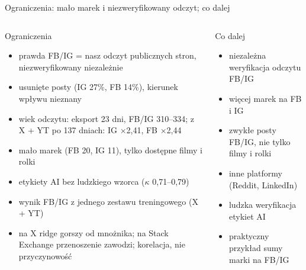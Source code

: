 \documentclass[aspectratio=169,10pt]{beamer}
\renewcommand{\x}[1]{$\times$#1}
\begin{document}
\begin{frame}{Ograniczenia: mało marek i niezweryfikowany odczyt; co dalej}
\begin{columns}[T]
\begin{block}{Ograniczenia}
\scriptsize
\begin{itemize}\setlength\itemsep{0pt}
\item prawda FB/IG = nasz odczyt publicznych stron, niezweryfikowany niezależnie
\item usunięte posty (IG 27\%, FB 14\%), kierunek wpływu nieznany
\item wiek odczytu: eksport 23 dni, FB/IG 310--334; z X + YT po 137 dniach: IG \x{2,41}, FB \x{2,44}
\item mało marek (FB 20, IG 11), tylko dostępne filmy i rolki
\item etykiety AI bez ludzkiego wzorca ($\kappa$ 0,71--0,79)
\item wynik FB/IG z jednego zestawu treningowego (X + YT)
\item na X ridge gorszy od mnożnika; na Stack Exchange przenoszenie zawodzi; korelacja, nie przyczynowość
\end{itemize}
\end{block}
\begin{block}{Co dalej}
\scriptsize
\begin{itemize}\setlength\itemsep{2pt}
\item niezależna weryfikacja odczytu FB/IG
\item więcej marek na FB i IG
\item zwykłe posty FB/IG, nie tylko filmy i rolki
\item inne platformy (Reddit, LinkedIn)
\item ludzka weryfikacja etykiet AI
\item praktyczny przykład sumy marki na FB/IG
\end{itemize}
\end{block}
\end{columns}
\end{frame}
\end{document}
